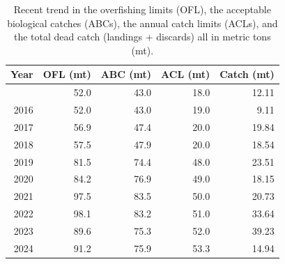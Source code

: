 \documentclass[
]{scrartcl}
\begin{document}
\begin{longtable}{rrrrr}

\caption{\label{tbl-yelloweye_management}Recent trend in the overfishing
limits (OFL), the acceptable biological catches (ABCs), the annual catch
limits (ACLs), and the total dead catch (landings + discards) all in
metric tons (mt).}

\tabularnewline

\toprule
Year & OFL (mt) & ABC (mt) & ACL (mt) & Catch (mt) \\ 
\midrule\addlinespace[2.5pt]
2015 & 52.0 & 43.0 & 18.0 & 12.11 \\ 
2016 & 52.0 & 43.0 & 19.0 & 9.11 \\ 
2017 & 56.9 & 47.4 & 20.0 & 19.84 \\ 
2018 & 57.5 & 47.9 & 20.0 & 18.54 \\ 
2019 & 81.5 & 74.4 & 48.0 & 23.51 \\ 
2020 & 84.2 & 76.9 & 49.0 & 18.15 \\ 
2021 & 97.5 & 83.5 & 50.0 & 20.73 \\ 
2022 & 98.1 & 83.2 & 51.0 & 33.64 \\ 
2023 & 89.6 & 75.3 & 52.0 & 39.23 \\ 
2024 & 91.2 & 75.9 & 53.3 & 14.94 \\ 
\bottomrule

\end{longtable}

\endgroup

\newpage{}
\end{document}
